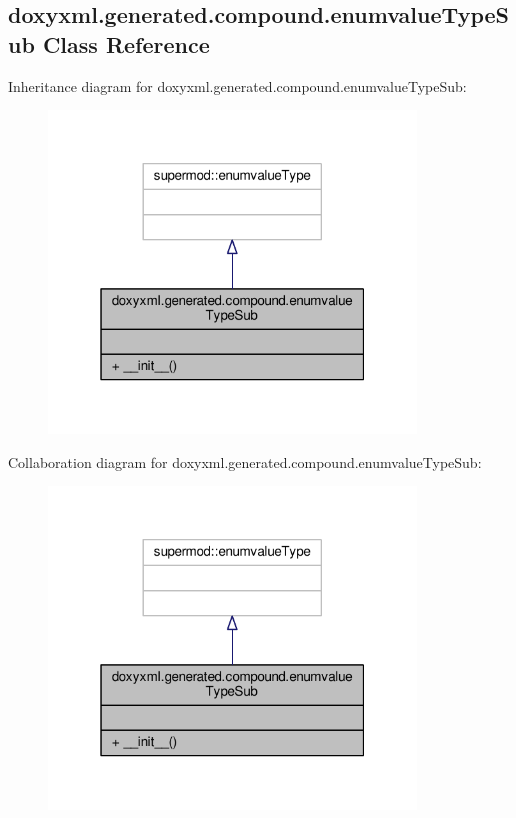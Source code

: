 \subsection{doxyxml.\+generated.\+compound.\+enumvalue\+Type\+Sub Class Reference}
\label{classdoxyxml_1_1generated_1_1compound_1_1enumvalueTypeSub}


Inheritance diagram for doxyxml.\+generated.\+compound.\+enumvalue\+Type\+Sub\+:
\nopagebreak
\begin{figure}[H]
\begin{center}
\leavevmode
\includegraphics[width=277pt]{db/d2c/classdoxyxml_1_1generated_1_1compound_1_1enumvalueTypeSub__inherit__graph}
\end{center}
\end{figure}


Collaboration diagram for doxyxml.\+generated.\+compound.\+enumvalue\+Type\+Sub\+:
\nopagebreak
\begin{figure}[H]
\begin{center}
\leavevmode
\includegraphics[width=277pt]{d9/d00/classdoxyxml_1_1generated_1_1compound_1_1enumvalueTypeSub__coll__graph}
\end{center}
\end{figure}
